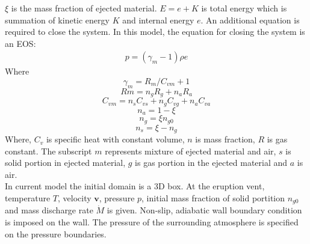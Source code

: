 \documentclass[conference,compsoc]{IEEEtran}
\begin{document}
$\xi$ is the mass fraction of ejected material.
$E = e + K $ is total energy which is summation of kinetic energy $K$ and internal energy $e$.
An additional equation is required to close the system. In this model, the equation for closing the system is an EOS:
\begin{align}
p = (\gamma_m - 1)\rho e \label{eq:EOS}
\end{align}
Where 
\begin{equation}
\gamma_m = R_m/C_{vm} + 1 \label{eq:gov-gm}
\end{equation}
\begin{equation}
Rm = n_gR_g + n_aR_a  \label{eq:gov-Rm}
\end{equation}
\begin{equation}
C_{vm} = n_s C_{vs} + n_g C_{vg} + n_a C_{va} \label{eq:gov-Cvm}
\end{equation}
\begin{equation}
n_a = 1 - \xi \label{eq:gov-na}
\end{equation}
\begin{equation}
n_g = \xi n_{g0} \label{eq:gov-ng}
\end{equation}
\begin{equation}
n_s = \xi - n_g \label{eq:gov-ns}
\end{equation}
Where, $C_v$ is specific heat with constant volume, $n$ is mass fraction, $R$ is gas constant. The subscript 
$m$ represents mixture of ejected material and air, $s$ is solid portion in ejected material, $g$ is gas portion in the ejected material and $a$ is air.\\
In current model the initial domain is a 3D box. 
At the eruption vent, temperature $T$, velocity $\textbf{v}$, pressure $p$, initial mass fraction of solid portition $n_{g0}$ and mass discharge rate $\dot M$ is given. 
Non-slip, adiabatic wall boundary condition is imposed on the wall. The pressure of the surrounding atmosphere is specified on the pressure boundaries. 
\end{document}
